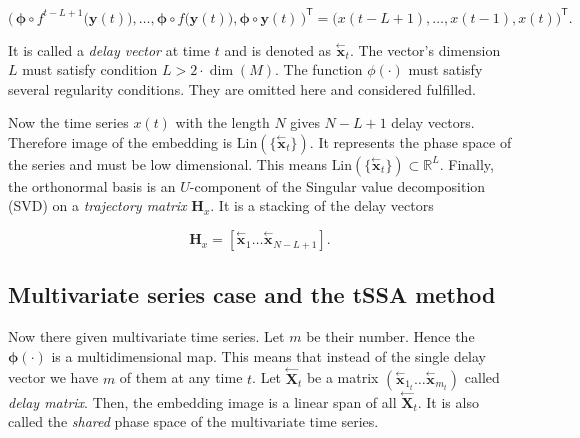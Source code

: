 \documentclass[referee, pdflatex, sn-mathphys-num]{sn-jnl}
\theoremstyle{definition}
\theoremstyle{plain}
\newcommand{\delayV}[1]{\overset{\leftarrow}{\mathbf{x}}_{#1}}
\newcommand{\delayM}[1]{\overset{\leftarrow}{\mathbf{X}}_{#1}}
\begin{document}
	\begin{equation*}
		\bigl( \, \boldsymbol{\phi} \circ f^{t - L + 1} \bigl( \mathbf{y}(t) \bigr), \ldots , \boldsymbol{\phi} \circ f \bigl( \mathbf{y}(t) \bigr), \boldsymbol{\phi} \circ \mathbf{y}(t) \, \bigr)^{\mathsf{T}} = \bigl( x(t - L + 1), \ldots , x(t-1), x(t) \bigr)^{\mathsf{T}}.
	\end{equation*}
	
	
	It is called a \emph{delay vector} at time $ t $ and is denoted as $ \delayV{t} $. The vector's dimension $ L $ must satisfy condition $ L > 2 \cdot \dim(M) $. The function $ \phi(\cdot) $ must satisfy several regularity conditions. They are omitted here and considered fulfilled.
	
	Now the time series $ x(t) $ with the length $ N $ gives $ N - L + 1 $ delay vectors. Therefore image of the embedding is $ \text{Lin}(\{\delayV{t}\}) $. It represents the phase space of the series and must be low dimensional. This means $ \text{Lin}(\{\delayV{t}\}) \subset \mathbb{R}^L $. Finally, the orthonormal basis is an $ U $-component of the Singular value decomposition (SVD) on a \emph{trajectory matrix} $ \mathbf{H}_x $. It is a stacking of the delay vectors
	
	\[
		\mathbf{H}_x = [ \delayV{1} \ldots  \delayV{N - L + 1}].
	\]
	
	\subsection{Multivariate series case and the tSSA method}\label{sec:tssa_method}
	
	Now there given multivariate time series. Let $ m $ be their number. Hence the $ \boldsymbol{\phi}(\cdot) $ is a multidimensional map. This means that instead of the single delay vector we have $ m $ of them at any time $ t $. Let $ \delayM{t} $ be a matrix $ ( \delayV{1_t} \ldots \delayV{m_t} ) $ called \emph{delay matrix}. Then, the embedding image is a linear span of all $ \delayM{t} $. It is also called the \emph{shared} phase space of the multivariate time series.
	
\end{document}
